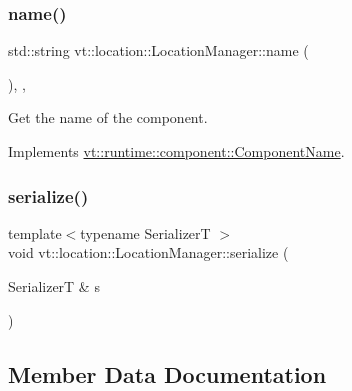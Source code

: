 \subsubsection{\texorpdfstring{name()}{name()}}
{\footnotesize\ttfamily std\+::string vt\+::location\+::\+Location\+Manager\+::name (\begin{DoxyParamCaption}{ }\end{DoxyParamCaption})\hspace{0.3cm}{\ttfamily [inline]}, {\ttfamily [override]}, {\ttfamily [virtual]}}



Get the name of the component. 



Implements \hyperlink{structvt_1_1runtime_1_1component_1_1_component_name_a33c06229bb605a2b2ceff68830d6d773}{vt\+::runtime\+::component\+::\+Component\+Name}.

\mbox{\label{structvt_1_1location_1_1_location_manager_a3f0b20c13abb9fcaf610fb3c62b324d5}} 
\subsubsection{\texorpdfstring{serialize()}{serialize()}}
{\footnotesize\ttfamily template$<$typename SerializerT $>$ \\
void vt\+::location\+::\+Location\+Manager\+::serialize (\begin{DoxyParamCaption}\item[{SerializerT \&}]{s }\end{DoxyParamCaption})\hspace{0.3cm}{\ttfamily [inline]}}



\subsection{Member Data Documentation}
\mbox{\label{structvt_1_1location_1_1_location_manager_a748aa3659f6aee39fb0936e694aa74ac}} 
